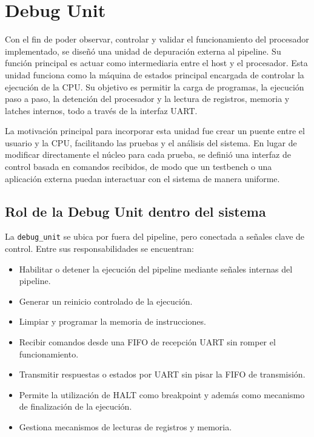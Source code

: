 \newpage

\section{Debug Unit}

Con el fin de poder observar, controlar y validar el funcionamiento del procesador implementado, se diseñó una unidad de depuración externa al pipeline. Su función principal es actuar como intermediaria entre el host y el procesador. Esta unidad funciona como la máquina de estados principal encargada de controlar la ejecución de la CPU. Su objetivo es permitir la carga de programas, la ejecución paso a paso, la detención del procesador y la lectura de registros, memoria y latches internos, todo a través de la interfaz UART.

La motivación principal para incorporar esta unidad fue crear un puente entre el usuario y la CPU, facilitando las pruebas y el análisis del sistema. En lugar de modificar directamente el núcleo para cada prueba, se definió una interfaz de control basada en comandos recibidos, de modo que un testbench o una aplicación externa puedan interactuar con el sistema de manera uniforme.

\subsection{Rol de la Debug Unit dentro del sistema}

La \texttt{debug\_unit} se ubica por fuera del pipeline, pero conectada a señales clave de control. Entre sus responsabilidades se encuentran:

\begin{itemize}
    \item Habilitar o detener la ejecución del pipeline mediante señales internas del pipeline.
    \item Generar un reinicio controlado de la ejecución.
    \item Limpiar y programar la memoria de instrucciones.
    \item Recibir comandos desde una FIFO de recepción UART sin romper el funcionamiento.
    \item Transmitir respuestas o estados por UART sin pisar la FIFO de transmisión.
    \item Permite la utilización de HALT como breakpoint y además como mecanismo de finalización de la ejecución.
    \item Gestiona mecanismos de lecturas de registros y memoria.
\end{itemize}

